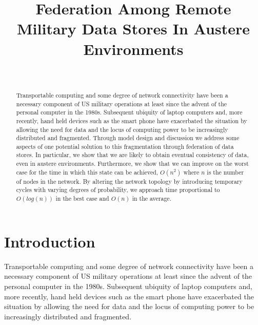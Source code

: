 \documentclass[10pt]{./IEEEtran}
\begin{document}
\title{Federation Among Remote Military Data Stores In Austere Environments}

\author{\\
}


\maketitle


\begin{abstract}
Transportable computing and some degree of network connectivity have been a necessary component of US military operations at least since the advent of the personal computer in the 1980s.  Subsequent ubiquity of laptop computers and, more recently, hand held devices such as the smart phone have exacerbated the situation by allowing the need for data and the locus of computing power to be increasingly distributed and fragmented.  Through model design and discussion we address some aspects of one potential solution to this fragmentation through federation of data stores.  In particular, we show that we are likely to obtain eventual consistency of data, even in austere environments.  Furthermore, we show that we can improve on the worst case for the time in which this state can be achieved, $O(n^{2})$ where $n$ is the number of nodes in the network.  By altering the network topology by introducing temporary cycles with varying degrees of probability, we approach time proportional to $O(log(n))$ in the best case and $O(n)$ in the average.
\end{abstract}


\IEEEpeerreviewmaketitle


\section{Introduction}
\label{sec:introduction}
Transportable computing and some degree of network connectivity have been a necessary component of US military operations at least since the advent of the personal computer in the 1980s.  Subsequent ubiquity of laptop computers and, more recently, hand held devices such as the smart phone have exacerbated the situation by allowing the need for data and the locus of computing power to be increasingly distributed and fragmented.  
\end{document}
